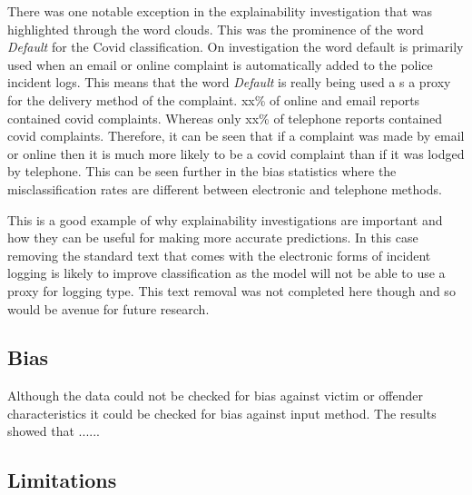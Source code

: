 There was one notable exception in the explainability investigation that was highlighted through the word clouds. This was the prominence of the word \emph{Default} for the Covid classification. On investigation the word default is primarily used when an email or online complaint is automatically added to the police incident logs. This means that the word \emph{Default} is really being used a s a proxy for the delivery method of the complaint.  xx\% of online and email reports contained covid complaints.  Whereas only xx\% of  telephone reports contained covid complaints. Therefore, it can be seen that if a complaint was made by email or online then it is much more likely to be a covid complaint than if it was lodged by telephone.   This can be seen further in the bias statistics where the misclassification rates are different between electronic and telephone methods. 

This is a good example of why explainability investigations are important and how they can be useful for making more accurate predictions. In this case removing the standard text that comes with the electronic forms of incident logging is likely to improve classification as the model will not be able to use a proxy for logging type. This text removal was not completed here though and so would be avenue for future research.

 

\subsection{Bias}Although the data could not be checked for bias against victim or offender characteristics it could be checked for bias against input method. The results showed that ......

\subsection{Limitations}

